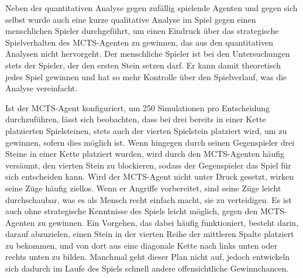 \label{qualitative-untersuchung}

Neben der quantitativen Analyse gegen zufällig spielende Agenten und gegen sich selbst wurde auch eine kurze qualitative Analyse im Spiel gegen einen menschlichen Spieler durchgeführt, um einen Eindruck über das strategische Spielverhalten des MCTS-Agenten zu gewinnen, das aus den quantitativen Analysen nicht hervorgeht. Der menschliche Spieler ist bei den Untersuchungen stets der Spieler, der den ersten Stein setzen darf. Er kann damit theoretisch jedes Spiel gewinnen und hat so mehr Kontrolle über den Spielverlauf, was die Analyse vereinfacht.

Ist der MCTS-Agent konfiguriert, um 250 Simulationen pro Entscheidung durchzuführen, lässt sich beobachten, dass bei drei bereits in einer Kette platzierten Spielsteinen, stets auch der vierten Spielstein platziert wird, um zu gewinnen, sofern dies möglich ist. Wenn hingegen durch seinen Gegenspieler drei Steine in einer Kette platziert wurden, wird durch den MCTS-Agenten häufig versäumt, den vierten Stein zu blockieren, sodass der Gegenspieler das Spiel für sich entscheiden kann. Wird der MCTS-Agent nicht unter Druck gesetzt, wirken seine Züge häufig ziellos. Wenn er Angriffe vorbereitet, sind seine Züge leicht durchschaubar, was es als Mensch recht einfach macht, sie zu verteidigen. Es ist auch ohne strategische Kenntnisse des Spiels leicht möglich, gegen den MCTS-Agenten zu gewinnen. Ein Vorgehen, das dabei häufig funktioniert, besteht darin, darauf abzuzielen, einen Stein in der vierten Reihe der mittleren Spalte platziert zu bekommen, und von dort aus eine diagonale Kette nach links unten oder rechts unten zu bilden. Manchmal geht dieser Plan nicht auf, jedoch entwickeln sich dadurch im Laufe des Spiels schnell andere offensichtliche Gewinnchancen.

